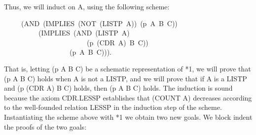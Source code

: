 \documentclass[11pt]{book}
\newenvironment{pubasis}{\begin{flushleft}\ttfamily\small}{\normalsize\rmfamily\end{flushleft}}
\begin{document}
Thus, we will induct on A, using the following scheme:
\begin{pubasis}
~~~~~(AND~(IMPLIES~(NOT~(LISTP~A))~(p~A~B~C))\\
~~~~~~~~~~(IMPLIES~(AND~(LISTP~A)\\
~~~~~~~~~~~~~~~~~~~~~~~~(p~(CDR~A)~B~C))\\
~~~~~~~~~~~~~~~~~~~(p~A~B~C))).\\
\end{pubasis}
That is, letting (p A B C) be a schematic representation of *1,
we will prove that (p A B C) holds when A is not a LISTP, and we will
prove that if A is a LISTP and (p (CDR A) B C) holds, then (p A B C) holds.
The induction is sound because the axiom
CDR.LESSP establishes that (COUNT A) decreases according to
the well-founded relation LESSP in the induction step of the
scheme.  Instantiating the scheme above with
*1 we obtain two new goals.  We block indent the proofs of
the two goals:
\end{document}

